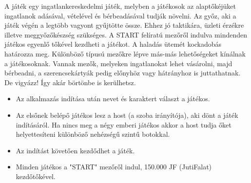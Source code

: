 

A játék egy ingatlankereskedelmi játék, melyben a játékosok az alaptőkéjüket ingatlanok adásával, vételével és bérbeadásával tudják növelni. Az győz, aki a játék végén a legtöbb vagyont gyűjtötte össze. Ehhez jó taktikára, üzleti érzékre illetve meggyőzőkészség szükséges. A START felíratú mezőről indulva mindenden játékos egyenlő tőkével kezdheti a játékot. A haladás ütemét kockadobás határozza meg. Különböző típusú mezőkre lépve más-más lehetőségeket kínálnak a játékosoknak. Vannak mezők, melyeken ingatlanokat lehet vásárolni, majd bérbeadni, a szerencsekártyák pedig előnyhöz vagy hátrányhoz is juttathatnak. De vigyázz! Így akár börtönbe is kerülhetsz. 


\begin{itemize}
\item Az alkalmazás indítása után nevet és karaktert választ a játékos.
\item Az elsőnek belépő játékos lesz a host (a szoba irányítója), aki dönt a játék indításáról. Ha nincs meg a négy emberi játékos akkor a host tudja őket helyettesíteni különböző nehézségű szintű botokkal.
\item Az indítást követően kezdődhet a játék.
\item Minden játékos a "START" mezőről indul, 150.000 JF (JutiFalat) kezdőtőkével.
\end{itemize}


